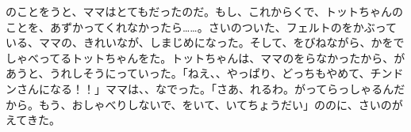 のことをうと、ママはとてもだったのだ。もし、これからくで、トットちゃんのことを、あずかってくれなかったら……。さいのついた、フェルトのをかぶっている、ママの、きれいなが、しまじめになった。そして、をびねながら、かをでしゃべってるトットちゃんをた。トットちゃんは、ママのをらなかったから、があうと、うれしそうにっていった。「ねえ、、やっぱり、どっちもやめて、チンドンさんになる！！」ママは、、なでった。「さあ、れるわ。がってらっしゃるんだから。もう、おしゃべりしないで、をいて、いてちょうだい」ののに、さいのがえてきた。


